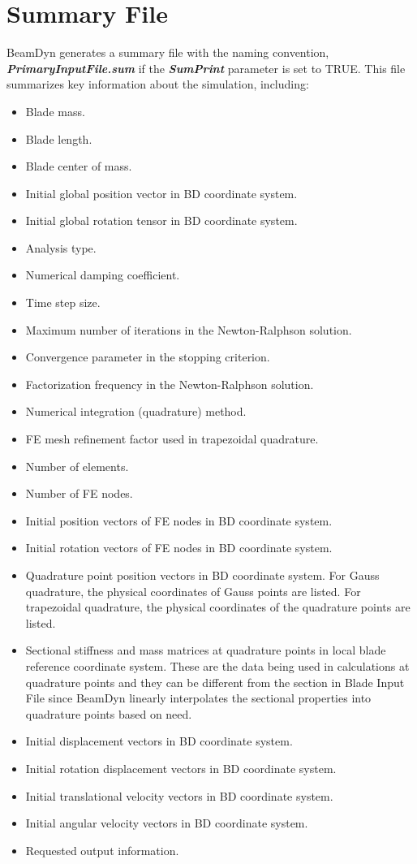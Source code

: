 \section{Summary File}
\label{sec:SumFile}
BeamDyn generates a summary file with the naming convention,  \textbf{\textit{PrimaryInputFile.sum} } if the  \textbf{\textit{SumPrint}} parameter is set to TRUE. This file summarizes key information about the simulation, including:
\begin{itemize}
  \item Blade mass.
  \item Blade length.
  \item Blade center of mass.
  \item Initial global position vector in BD coordinate system.
  \item Initial global rotation tensor in BD coordinate system.
  \item Analysis type.
  \item Numerical damping coefficient.
  \item Time step size.
  \item Maximum number of iterations in the Newton-Ralphson solution.
  \item Convergence parameter in the stopping criterion.
  \item Factorization frequency in the Newton-Ralphson solution.
  \item Numerical integration (quadrature) method.
  \item FE mesh refinement factor used in trapezoidal quadrature.
  \item Number of elements.
  \item Number of FE nodes.
  \item Initial position vectors of FE nodes in BD coordinate system.
  \item Initial rotation vectors of FE nodes in BD coordinate system.
  \item Quadrature point position vectors in BD coordinate system. For Gauss quadrature, the physical coordinates of Gauss points are listed. For trapezoidal quadrature, the physical coordinates of the quadrature points are listed.
  \item Sectional stiffness and mass matrices at quadrature points in local blade reference coordinate system. These are the data being used in calculations at quadrature points and they can be different from the section in Blade Input File since BeamDyn linearly interpolates the sectional properties into quadrature points based on need.
  \item Initial displacement vectors in BD coordinate system.
  \item Initial rotation displacement vectors in BD coordinate system.
  \item Initial translational velocity vectors in BD coordinate system.
  \item Initial angular velocity vectors in BD coordinate system.
  \item Requested output information.
\end{itemize}
